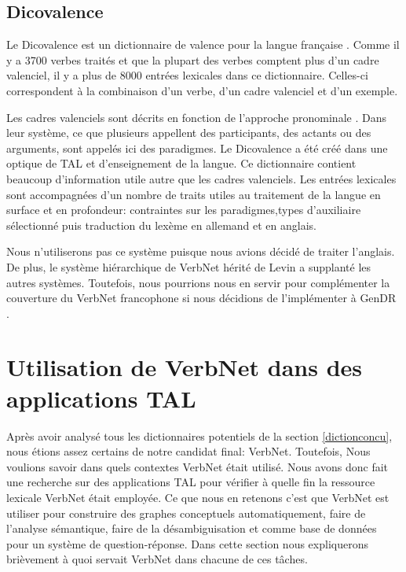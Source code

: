 \subsection{Dicovalence}
Le Dicovalence est un dictionnaire de valence pour la langue française \citep{MertensdictionnairevalenceDICOVALENCE2006}. Comme il y a 3700 verbes traités et que la plupart des verbes comptent plus d'un cadre valenciel, il y a plus de 8000 entrées lexicales dans ce dictionnaire. Celles-ci correspondent à la combinaison d'un verbe, d'un cadre valenciel et d'un exemple. 

Les cadres valenciels sont décrits en fonction de l'approche pronominale \citep{blanche1987pronom} . Dans leur système, ce que plusieurs appellent des participants, des actants ou des arguments, sont appelés ici des paradigmes. Le Dicovalence a été créé dans une optique de \ac{TAL} et d'enseignement de la langue. Ce dictionnaire contient beaucoup d'information utile autre que les cadres valenciels. Les entrées lexicales sont accompagnées d'un nombre de traits utiles au traitement de la langue en surface et en profondeur: contraintes sur les paradigmes,types d'auxiliaire sélectionné puis traduction du lexème en allemand et en anglais.

Nous n'utiliserons pas ce système puisque nous avions décidé de traiter l'anglais. De plus, le système hiérarchique de VerbNet hérité de Levin a supplanté les autres systèmes. Toutefois, nous pourrions nous en servir pour complémenter la couverture du VerbNet francophone \citep{DanlosVerscreationVerb} si nous décidions de l'implémenter à GenDR \citep{lareau18}.


\section {Utilisation de VerbNet dans des applications \ac{TAL}}
Après avoir analysé tous les dictionnaires potentiels de la section \ref{dictionconcu}, nous étions assez certains de notre candidat final: VerbNet. Toutefois, Nous voulions savoir dans quels contextes VerbNet était utilisé. Nous avons donc fait une recherche sur des applications \ac{TAL} pour vérifier à quelle fin la ressource lexicale VerbNet était employée. Ce que nous en retenons c'est que VerbNet est utiliser pour construire des graphes conceptuels automatiquement, faire de l'analyse sémantique, faire de la désambiguisation et comme base de données pour un système de question-réponse. Dans cette section nous expliquerons brièvement à quoi servait VerbNet dans chacune de ces tâches.

